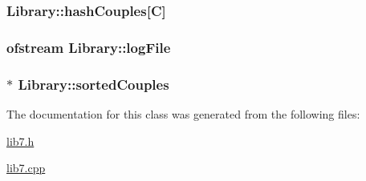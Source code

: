 \subsubsection[{\texorpdfstring{hash\+Couples}{hashCouples}}]{ Library\+::hash\+Couples\mbox{[}{\bf C}\mbox{]}}\hypertarget{classLibrary_a81e01bd9f8b2f1fdbc3420b71de2dc49}{}\label{classLibrary_a81e01bd9f8b2f1fdbc3420b71de2dc49}
\subsubsection[{\texorpdfstring{log\+File}{logFile}}]{\setlength{\rightskip}{0pt plus 5cm}ofstream Library\+::log\+File}\hypertarget{classLibrary_ad8fbb4e17a98e57b3cffe8257710045d}{}\label{classLibrary_ad8fbb4e17a98e57b3cffe8257710045d}
\subsubsection[{\texorpdfstring{sorted\+Couples}{sortedCouples}}]{$\ast$ Library\+::sorted\+Couples}\hypertarget{classLibrary_ac22a9d065ab96fcb3d44e203725e6de6}{}\label{classLibrary_ac22a9d065ab96fcb3d44e203725e6de6}


The documentation for this class was generated from the following files\+:\begin{DoxyCompactItemize}
\item 
\hyperlink{lib7_8h}{lib7.\+h}\item 
\hyperlink{lib7_8cpp}{lib7.\+cpp}\end{DoxyCompactItemize}
